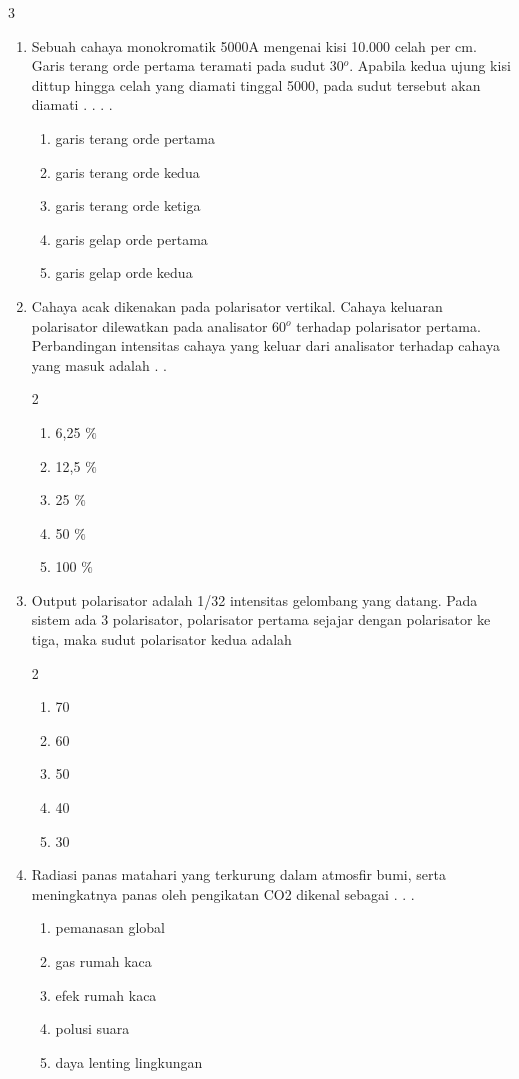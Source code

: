 \documentclass[10pt,a4paper]{extarticle}
\newcommand*\pilgan[1]{
\begin{enumerate}[label=\Alph*., itemsep=0pt,topsep=0pt,leftmargin=*,align=Center] #1 
\end{enumerate}}
\newcommand{\pilgani}[1]{                            \vspace{-0.3cm}\begin{multicols}{2}
 \begin{enumerate}[label=\Alph*., itemsep=0pt,topsep=0pt,leftmargin=*,align=Center]#1                     \end{enumerate}
 \phantom{ini cuma sapi, wedus, dan ayam}
 \end{multicols}}
\begin{document}
\begin{multicols}{3}
\begin{enumerate}
\vspace{2cm}

\item Sebuah cahaya monokromatik 5000A mengenai kisi 10.000 celah per cm. Garis terang orde pertama teramati pada sudut 30$^o$. Apabila kedua ujung kisi dittup hingga celah yang diamati tinggal 5000, pada sudut tersebut akan diamati . . . .
\pilgan{
   \item garis terang orde pertama
   \item garis terang orde kedua
   \item garis terang orde ketiga
   \item garis gelap orde pertama
   \item garis gelap orde kedua}
\vspace{2cm}

\item Cahaya acak dikenakan pada polarisator vertikal. Cahaya keluaran polarisator dilewatkan pada analisator 60$^o$ terhadap polarisator pertama. Perbandingan intensitas cahaya yang keluar dari analisator terhadap cahaya yang masuk adalah . . 
\pilgani{
   \item 6,25 $\%$ 
   \item 12,5 $\%$
   \item 25 $\%$
   \item 50 $\%$
   \item 100 $\%$
    }

\vspace{2cm}
\item Output polarisator adalah 1/32 intensitas gelombang yang datang. Pada sistem ada 3 polarisator, polarisator pertama sejajar dengan polarisator ke tiga, maka sudut polarisator kedua adalah
\pilgani{
   \item 70
   \item 60
   \item 50
   \item 40
   \item 30}
\vspace{2cm}

\item Radiasi panas matahari yang terkurung dalam atmosfir bumi, serta meningkatnya panas oleh pengikatan CO2 dikenal sebagai . . .  
\pilgan{
\item pemanasan global
\item gas rumah kaca
\item efek rumah kaca
\item polusi suara
\item daya lenting lingkungan}


\end{enumerate}
\end{multicols}
\end{document}
